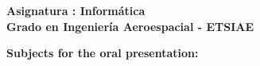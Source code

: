 \documentclass[12pt,spanish]{article}
\begin{document}
\begin{center}
	{\bf \Large Asignatura : 
	Informática}                                               
	\\ \vspace{1cm}
	{\bf \Large Grado en Ingeniería Aeroespacial - 
	ETSIAE}                                            \\
\end{center}

\vspace{1cm}

\noindent
{\bf \Large Subjects for the oral presentation: 
}                                                                               

\vspace{0.5cm}
\end{document}
